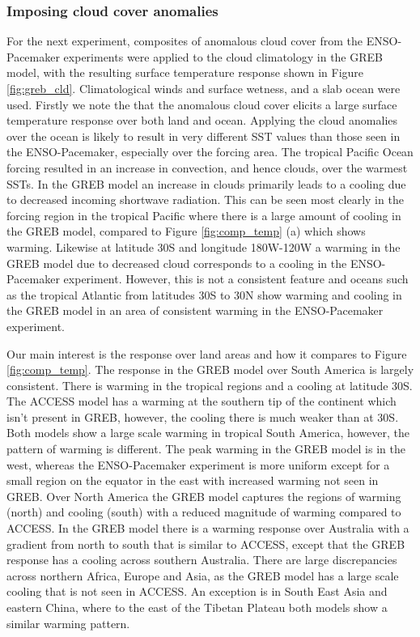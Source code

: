 \subsubsection{Imposing cloud cover anomalies}
For the next experiment, composites of anomalous cloud cover from the 
ENSO-Pacemaker experiments were applied to the cloud climatology in the GREB 
model, with the resulting surface temperature response shown in Figure 
\ref{fig:greb_cld}. Climatological winds and surface wetness, and a slab ocean 
were used. Firstly we note the that the anomalous cloud cover elicits a large 
surface temperature response over both land and ocean.  Applying the cloud 
anomalies over the ocean is likely to result in very different SST values than 
those seen in the ENSO-Pacemaker, especially over the forcing area.  The 
tropical Pacific Ocean forcing resulted in an increase in convection, and hence 
clouds, over the warmest SSTs. In the GREB model an increase in clouds primarily 
leads to a cooling due to decreased incoming shortwave radiation. This can be 
seen most clearly in the forcing region in the tropical Pacific where there is a 
large amount of cooling in the GREB model, compared to Figure 
\ref{fig:comp_temp} (a) which shows warming.  Likewise at latitude 30S and 
longitude 180W-120W a warming in the GREB model due to decreased cloud 
corresponds to a cooling in the ENSO-Pacemaker experiment.  However, this is not 
a consistent feature and oceans such as the tropical Atlantic from latitudes 
30S to 30N show warming and cooling in the GREB model in an area of consistent 
warming in the ENSO-Pacemaker experiment.

Our main interest is the response over land areas and how it compares to Figure 
\ref{fig:comp_temp}. The response in the GREB model over South America is 
largely consistent. There is warming in the tropical regions and a cooling at 
latitude 30S. The ACCESS model has a warming at the southern tip of the 
continent which isn't present in GREB, however, the cooling there is much weaker 
than at 30S.  Both models show a large scale warming in tropical South America, 
however, the pattern of warming is different. The peak warming in the GREB model 
is in the west, whereas the ENSO-Pacemaker experiment is more uniform except for 
a small region on the equator in the east with increased warming not seen in 
GREB.  Over North America the GREB model captures the regions of warming (north) 
and cooling (south) with a reduced magnitude of warming compared to ACCESS. In 
the GREB model there is a warming response over Australia with a gradient from 
north to south that is similar to ACCESS, except that the GREB response has a 
cooling across southern Australia.  There are large discrepancies across 
northern Africa, Europe and Asia, as the GREB model has a large scale cooling 
that is not seen in ACCESS. An exception is in South East Asia and eastern 
China, where to the east of the Tibetan Plateau both models show a similar 
warming pattern. 

